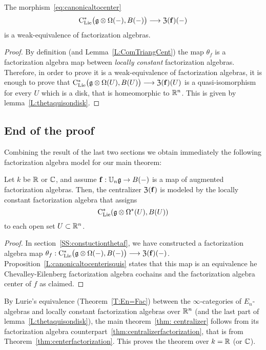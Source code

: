 \documentclass[11pt]{amsart}
\numberwithin{equation}{section}
\begin{document}
\begin{prp}\label{L:canonicaltocenterisquis} The morphism~\eqref{eq:canonicaltocenter}
\[{\rm C}_{\rm Lie}^*\big(\mathfrak g\otimes \Omega (-), B(-) \big) \longrightarrow  {\frak Z}(\mathbf{f})(-)\] is a weak-equivalence of factorization algebras. 
\end{prp}
\begin{proof}
By definition (and Lemma~\ref{L:ComTriangCent}) the map 
$\theta_f$ is a factorization algebra map between \emph{locally constant} factorization algebras. 
Therefore, in order to prove it is a weak-equivalence of factorization algebras, it is enough to prove that 
${\rm C}_{\rm Lie}^*\big(\mathfrak g\otimes \Omega (U), B(U) \big) \longrightarrow  {\frak Z}(\mathbf{f})(U)$ is a quasi-isomorphism for every $U$ which is a disk, that is 
homeomorphic to $\mathbb R^n$. This is given by lemma~\ref{L:thetaquisondisk}.
\end{proof}

\subsection{End of the proof}
Combining the result of the last two sections we obtain immediately the following factorization algebra model for our main theorem:
\begin{thm}\label{thm:centralizerfactorization}
Let $k$ be $\mathbb R$ or $\mathbb C$, and assume $\mathbf{f}:  \mathbb U_n \mathfrak g \to B(-)$ is a map of augmented factorization algebras. 
Then, the centralizer ${\frak Z}(\mathbf{f})$ is modeled by the locally constant factorization algebra that assigns
\[
{\rm C}_{\rm Lie}^*(\mathfrak g \otimes \Omega^*(U), B(U))
\]
to each open set $U \subset \mathbb R^n$. 
\end{thm}
\begin{proof}
 In section~\ref{SS:constuctionthetaf}, we have constructed a factorization algebra map 
 $\theta_f: {\rm C}_{\rm Lie}^*\big(\mathfrak g\otimes \Omega (-), B(-) \big) \longrightarrow  {\frak Z}(\mathbf{f})(-)$. Proposition~\ref{L:canonicaltocenterisquis} 
 states that this map is an equivalence he Chevalley-Eilenberg factorization algebra cochains and the factorization algebra center of $f$ as claimed.
\end{proof}
By Lurie's equivalence (Theorem~\ref{T:En=Fac}) between the $\infty$-categories of $E_n$-algebras and locally constant factorization algebras 
over $\mathbb R^n$ (and the last part of lemma~\ref{L:thetaquisondisk}),
the main theorem~\ref{thm: centralizer} follows from its factorization algebra counterpart~\ref{thm:centralizerfactorization}, 
that is from Theorem~\ref{thm:centerfactorization}. This proves the theorem over $k=\mathbb R$ (or $\mathbb C$). 
\end{document}
